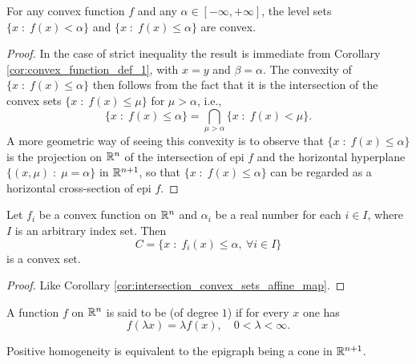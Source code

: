 \documentclass[11pt,a4paper]{article}
\begin{document}
\begin{theorem}
    For any convex function $f$ and any $\alpha\in [-\infty,+\infty]$, the level sets $\{x\;:\;f(x)<\alpha\}$ and $\{x\;:\;f(x)\le\alpha\}$ are convex.
\end{theorem}

\begin{proof}
    In the case of strict inequality the result is immediate from Corollary \ref{cor:convex_function_def_1}, with $x = y$ and $\beta = \alpha$. The convexity of $\{x\;:\;f(x)\le \alpha\}$ then follows from the fact that it is the intersection of the convex sets $\{x\;:\;f(x)\le \mu\}$ for $\mu>\alpha$, i.e.,
    \begin{equation*}
        \{x\;:\;f(x)\le \alpha\} = \bigcap_{\mu>\alpha} \{x\;:\;f(x)< \mu\}.
    \end{equation*}
    A more geometric way of seeing this convexity is to observe that $\{x\;:\;f(x)\le \alpha\}$ is the projection on $\mathbb{R}^n$ of the intersection of epi $f$ and the horizontal hyperplane $\{(x,\mu)\;:\;\mu=\alpha\}$ in $\mathbb{R}^{n+1}$, so that $\{x\;:\;f(x)\le \alpha\}$ can be regarded as a horizontal cross-section of epi $f$.
\end{proof}

\begin{corollary}\label{cor:intersection_convex_sets_convex_map}
    Let $f_i$ be a convex function on $\mathbb{R}^n$ and $\alpha_i$ be a real number for each $i\in I$, where $I$ is an arbitrary index set. Then
    \begin{equation*}
        C = \{x\;:\;f_i(x)\le \alpha,\ \forall i\in I\}
    \end{equation*}
    is a convex set.
\end{corollary}

\begin{proof}
    Like Corollary \ref{cor:intersection_convex_sets_affine_map}.
\end{proof}

\begin{definition}\label{def:postively_homogeneous}
    A function $f$ on $\mathbb{R}^n$ is said to be  (of degree $1$) if for every $x$ one has
    \begin{equation*}
        f(\lambda x) = \lambda f(x), \quad 0<\lambda<\infty.
    \end{equation*}
\end{definition}

\begin{remark}
    Positive homogeneity is equivalent to the epigraph being a cone in $\mathbb{R}^{n+1}$. 
\end{remark}
\end{document}
